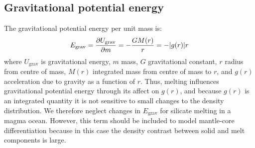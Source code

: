 \subsection{Gravitational potential energy}
The gravitational potential energy per unit mass is:
\begin{equation}
E_{\rm grav} = \frac{\partial U_{\rm grav}}{\partial m} = - \frac{G M(r)}{r} = - |g(r)|r
\end{equation}
where $U_{\mathrm{grav}}$ is gravitational energy, $m$ mass, $G$ gravitational constant, $r$ radius from centre of mass, $M(r)$ integrated mass from centre of mass to $r$, and $g(r)$ acceleration due to gravity as a function of $r$.
Thus, melting influences gravitational potential energy through its affect on $g(r)$, and because $g(r)$ is an integrated quantity it is not sensitive to small changes to the density distribution.  We therefore neglect changes in $E_{\mathrm{grav}}$ for silicate melting in a magma ocean.  However, this term should be included to model mantle-core differentiation because in this case the density contrast between solid and melt components is large.